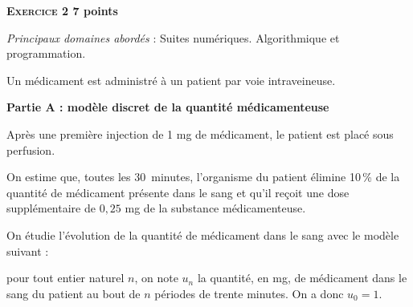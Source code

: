 \documentclass[11pt]{article}
\begin{document}
\bigskip

\textbf{\textsc{Exercice 2} \hfill 7 points}

\medskip

\emph{Principaux domaines abordés} : Suites numériques. Algorithmique et programmation.

\medskip

Un médicament est administré à un patient par voie intraveineuse. 

\bigskip

\textbf{Partie A : modèle discret de la quantité médicamenteuse}

\medskip

Après une première injection de 1 mg de médicament, le patient est placé sous perfusion.

On estime que, toutes les $30$~minutes, l'organisme du patient élimine 10\,\% de la quantité de médicament présente dans le sang et qu'il reçoit une dose supplémentaire de $0,25$ mg de la substance médicamenteuse.

On étudie l'évolution de la quantité de médicament dans le sang avec le modèle suivant :

pour tout entier naturel $n$, on note $u_n$ la quantité, en mg, de médicament dans le sang du patient au bout de $n$ périodes de trente minutes. On a donc $u_0 = 1$.

\medskip
\end{document}
